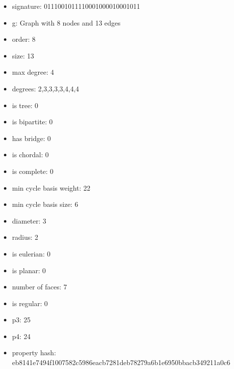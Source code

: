 \begin{itemize}
\item signature: 0111001011110001000010001011
\item g: Graph with 8 nodes and 13 edges
\item order: 8
\item size: 13
\item max degree: 4
\item degrees: 2,3,3,3,3,4,4,4
\item is tree: 0
\item is bipartite: 0
\item has bridge: 0
\item is chordal: 0
\item is complete: 0
\item min cycle basis weight: 22
\item min cycle basis size: 6
\item diameter: 3
\item radius: 2
\item is eulerian: 0
\item is planar: 0
\item number of faces: 7
\item is regular: 0
\item p3: 25
\item p4: 24
\item property hash: eb8141e7494f1007582c5986eacb7281deb78279a6b1e6950bbacb349211a0c6
\end{itemize}
\newpage
\begin{figure}
\end{figure}
